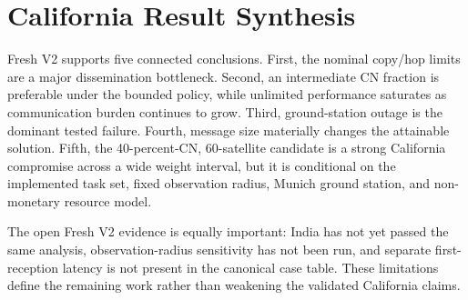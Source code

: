 \section{California Result Synthesis}

Fresh V2 supports five connected conclusions. First, the nominal copy/hop limits are a major dissemination bottleneck. Second, an intermediate CN fraction is preferable under the bounded policy, while unlimited performance saturates as communication burden continues to grow. Third, ground-station outage is the dominant tested failure. Fourth, message size materially changes the attainable solution. Fifth, the 40-percent-CN, 60-satellite candidate is a strong California compromise across a wide weight interval, but it is conditional on the implemented task set, fixed observation radius, Munich ground station, and non-monetary resource model.

The open Fresh V2 evidence is equally important: India has not yet passed the same analysis, observation-radius sensitivity has not been run, and separate first-reception latency is not present in the canonical case table. These limitations define the remaining work rather than weakening the validated California claims.

